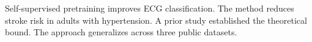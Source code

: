 Self-supervised pretraining improves ECG classification.
The method reduces stroke risk in adults with hypertension.
A prior study established the theoretical bound.
The approach generalizes across three public datasets.

